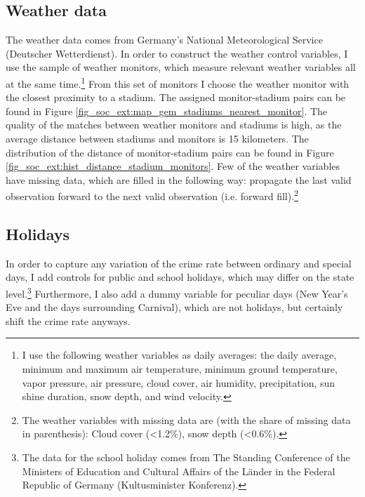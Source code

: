 \documentclass[11pt, a4paper]{article} %
\begin{document}
\subsection{Weather data}
The weather data comes from Germany's National Meteorological Service (Deutscher Wetterdienst). In order to construct the weather control variables, I use the sample of weather monitors, which measure relevant weather variables all at the same time.\footnote{I use the following weather variables as daily averages: the daily average, minimum and maximum air temperature, minimum ground temperature, vapor pressure, air pressure, cloud cover, air humidity, precipitation, sun shine duration, snow depth, and wind velocity.} From this set of monitors I choose the weather monitor with the closest proximity to a stadium. The assigned monitor-stadium pairs can be found in Figure \ref{fig_soc_ext:map_gem_stadiums_nearest_monitor}. The quality of the matches between weather monitors and stadiums is high, as the average distance between stadiums and monitors is 15 kilometers. The distribution of the distance of monitor-stadium pairs can be found in Figure \ref{fig_soc_ext:hist_distance_stadium_monitors}. Few of the weather variables have missing data, which are filled in the following way: propagate the last valid observation forward to the next valid observation (i.e. forward fill).\footnote{The weather variables with missing data are (with the share of missing data in parenthesis): Cloud cover (<1.2\%), snow depth (<0.6\%).}



\subsection{Holidays}
In order to capture any variation of the crime rate between ordinary and special days, I add controls for public and school holidays, which may differ on the state level.\footnote{The data for the school holiday comes from The Standing Conference of the Ministers of Education and Cultural Affairs of the Länder in the Federal Republic of Germany (Kultusminister Konferenz).} Furthermore, I also add a dummy variable for peculiar days (New Year's Eve and the days surrounding Carnival), which are not holidays, but certainly shift the crime rate anyways.
\end{document}
